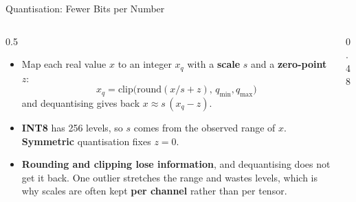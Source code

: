 \begin{frame}{Quantisation: Fewer Bits per Number}

    \begin{columns}[T]
        \begin{column}{0.5\textwidth}
            \begin{itemize}
                \small
                \item Map each real value $x$ to an integer $x_q$ with a \textbf{scale} $s$ and a
                      \textbf{zero-point} $z$:
                      \[
                          x_q = \mathrm{clip}\big(\mathrm{round}(x/s + z),\, q_{\min}, q_{\max}\big)
                      \]
                      and dequantising gives back $x \approx s\,(x_q - z)$.
                \item \textbf{INT8} has 256 levels, so $s$ comes from the observed range of $x$.
                      \textbf{Symmetric} quantisation fixes $z = 0$.
                \item \textbf{Rounding and clipping lose information}, and dequantising does not get it back.
                      One outlier stretches the range and wastes levels, which is why scales are often kept
                      \textbf{per channel} rather than per tensor.
            \end{itemize}
        \end{column}
        \begin{column}{0.48\textwidth}
            \centering
\end{column}
\end{columns}
\end{frame}
